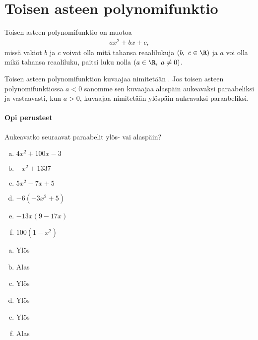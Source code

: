 \section{Toisen asteen polynomifunktio}


Toisen asteen polynomifunktio on muotoa
\begin{align*}
ax^2+bx+c,
\end{align*}
missä vakiot $b$ ja $c$ voivat olla mitä tahansa reaalilukuja $(b, \ c \in \R)$ ja $a$ voi olla mikä tahansa reaaliluku, paitsi luku nolla $(a \in \R, \ a \neq 0)$.

Toisen asteen polynomifunktion kuvaajaa nimitetään . Jos toisen asteen polynomifunktiossa $a < 0$ sanomme sen kuvaajaa
alaspäin aukeavaksi paraabeliksi ja vastaavasti, kun $a > 0$, kuvaajaa nimitetään ylöspäin aukeavaksi paraabeliksi.


\begin{tehtavasivu}

\paragraph*{Opi perusteet}

\begin{tehtava}
  Aukeavatko seuraavat paraabelit ylös- vai alaspäin?
  \begin{enumerate}[a)]
    \item $4x^2 + 100x - 3$
    \item $-x^2 + 1337$
    \item $5x^2 - 7x + 5$
    \item $-6(-3x^2 + 5)$
    \item $-13x(9 - 17x)$
    \item $100(1-x^2)$
  \end{enumerate}

  \begin{vastaus}
    \begin{enumerate}[a)]
      \item Ylös
      \item Alas
      \item Ylös
      \item Ylös
      \item Ylös
      \item Alas
    \end{enumerate}
  \end{vastaus}
\end{tehtava}

\end{tehtavasivu}
